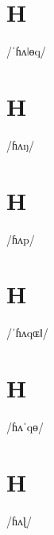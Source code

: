 \documentclass[10pt,a4paper,twoside]{book}
\begin{document}
\section*{H}

\begin{multicols}{3}
 {/ˈɦʌǀɵq/} {}
\end{multicols}

\section*{H}

\begin{multicols}{3}
 {/ɦʌŋ/} {}
\end{multicols}

\section*{H}

\begin{multicols}{3}
 {/ɦʌp/} {}
\end{multicols}

\section*{H}

\begin{multicols}{3}
 {/ˈɦʌqɶǁ/} {}
\end{multicols}

\section*{H}

\begin{multicols}{3}
 {/ɦʌˈqɵ/} {}
\end{multicols}

\section*{H}

\begin{multicols}{3}
 {/ɦʌɭ/} {}
\end{multicols}
\end{document}

